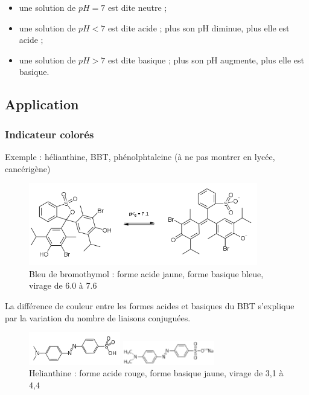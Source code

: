 \documentclass{article}%
\begin{document}
\begin{itemize}
	\item    une solution de $pH = 7$ est dite neutre ;
	\item    une solution de $pH < 7$ est dite acide ; plus son pH diminue, plus elle est acide ;
	\item    une solution de $pH > 7$ est dite basique ; plus son pH augmente, plus elle est basique.
\end{itemize}

    \subsection{Application}
\subsubsection{Indicateur colorés}

Exemple : hélianthine, BBT, phénolphtaleine (à ne pas montrer en lycée, cancérigène)
\begin{figure}
	\centerline{\includegraphics[width=10cm]{images/indicateurs/Bromothymol_blue_protolysis.png}}
	\caption{Bleu de bromothymol : forme acide jaune, forme basique bleue, virage de 6.0 à 7.6}
\end{figure}

La différence de couleur entre les formes acides et basiques du BBT s'explique par la variation du nombre de liaisons conjuguées.

\begin{figure}
	\begin{minipage}[t]{0,5\textwidth}
	\includegraphics[width=4cm]{images/indicateurs/Helianthine_topologique.png}
\end{minipage}
	\begin{minipage}[t]{0,5\textwidth}
	\includegraphics[width=4cm]{images/indicateurs/Methyl_orange.png}
\end{minipage}
\caption{Helianthine : forme acide rouge, forme basique jaune, virage de 3,1 à 4,4}
\end{figure}
\end{document}
